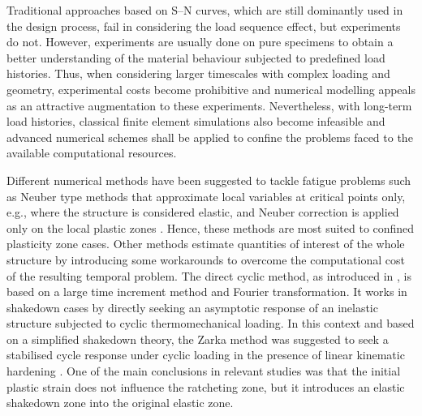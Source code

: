 Traditional approaches based on S--N curves, which are still dominantly used in the design process, fail in considering the load sequence effect, but experiments do not. However, experiments are usually done on pure specimens to obtain a better understanding of the material behaviour subjected to predefined load histories. Thus, when considering larger timescales with complex loading and geometry, experimental costs become prohibitive and numerical modelling appeals as an attractive augmentation to these experiments. Nevertheless, with long-term load histories, classical finite element simulations also become infeasible and advanced numerical schemes shall be applied to confine the problems faced to the available computational resources.

Different numerical methods have been suggested to tackle fatigue problems such as Neuber type methods that approximate local variables at critical points only, e.g., \parencite{neuber} where the structure is considered elastic, and Neuber correction is applied only on the local plastic zones \parencite{desmorat_energetic,lemaitre2005engineering}. Hence, these methods are most suited to confined plasticity zone cases. Other methods estimate quantities of interest of the whole structure by introducing some workarounds to overcome the computational cost of the resulting temporal problem. The direct cyclic method, as introduced in \parencite{maitournam2002determination}, is based on a large time increment method and Fourier transformation. It works in shakedown cases by directly seeking an asymptotic response of an inelastic structure subjected to cyclic thermomechanical loading. In this context and based on a simplified shakedown theory, the Zarka method was suggested to seek a stabilised cycle response under cyclic loading in the presence of linear kinematic hardening \parencite{zarka1981elastic}. One of the main conclusions in relevant studies was that the initial plastic strain does not influence the ratcheting zone, but it introduces an elastic shakedown zone into the original elastic zone.


